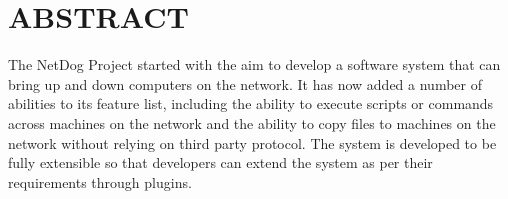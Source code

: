 \chapter*{\rm \large \bf ABSTRACT}
\vspace{4.0mm}
\setlength{\parindent}{4em}

\par
The NetDog Project started with the aim to develop a software system that can
bring up and down computers on the network. It has now added a number of
abilities to its feature list, including the ability to execute scripts or
commands across machines on the network and the ability to copy files to
machines on the network without relying on third party protocol. The system is
developed to be fully extensible so that developers can extend the system as
per their requirements through plugins.
\newpage 
